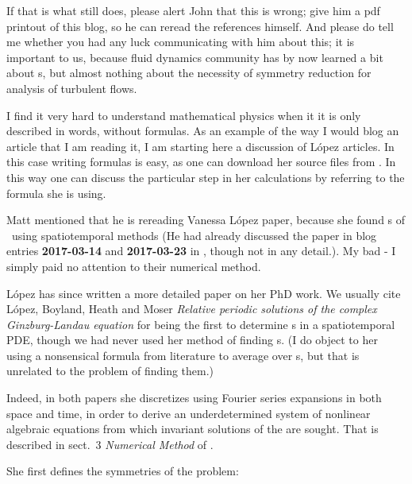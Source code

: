 \begin{description}
{If that is what  still does, please
alert John that this is wrong; give him a pdf printout of this blog, so he can
reread the references himself. And please do tell me whether you had any luck
communicating with him about this; it is important to us, because fluid
dynamics community has by now learned a bit about {\po}s, but almost nothing
about the necessity of symmetry reduction for analysis of turbulent flows.
    }

 {
I find it very hard to understand mathematical physics when it it is only
described in words, without formulas. As an example of the way I would blog an
article that I am reading it,  I am starting here a discussion of L\'{o}pez
articles.
In this case writing formulas is easy, as one can download her source files
from . In this way one can discuss the particular step in
her calculations by referring to the formula she is using.
    }

 {
\label{2017-03-14MNG}
Matt mentioned that he is rereading Vanessa L\'{o}pez paper,
because she found {\rpo}s of \cGL\ using spatiotemporal methods
(He had already discussed the paper in blog entries {\bf 2017-03-14} and
{\bf 2017-03-23} in , though not in any detail.).
My bad - I simply paid no attention to their numerical method.

L\'{o}pez has since written a more detailed paper on her PhD work.
We usually cite L{\'o}pez, Boyland, Heath and Moser {\em Relative
periodic solutions of the complex {Ginzburg-Landau} equation} for being the
first to determine {\rpo}s in a spatiotemporal PDE, though we had never used her
method of finding {\rpo}s. (I do object to her using a nonsensical formula from
literature to average over {\rpo}s, but that is unrelated to the problem of
finding them.)

Indeed, in both papers she discretizes using Fourier series expansions in both
space and time, in order to derive an underdetermined system of nonlinear
algebraic equations from which invariant solutions of the {\cGLe} are sought.
That is described in sect.~3 {\em Numerical Method} of .

She first defines the symmetries of the problem:

}
\end{description}
